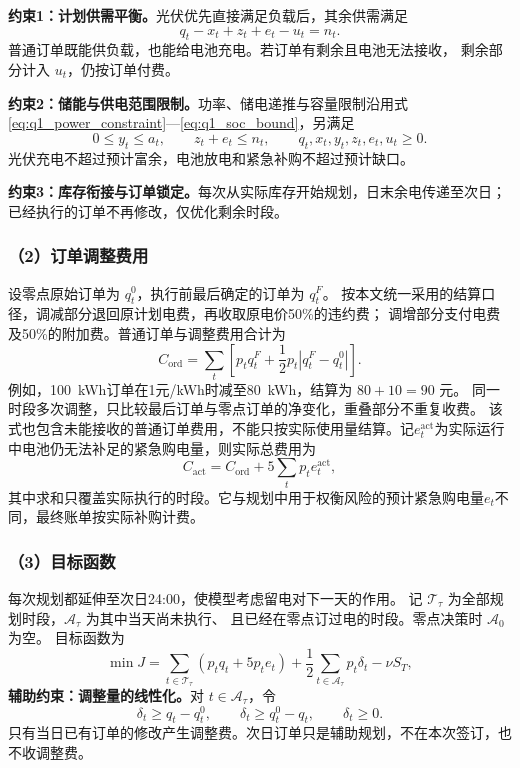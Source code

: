 \noindent\textbf{约束1：计划供需平衡。}光伏优先直接满足负载后，其余供需满足
\begin{equation}
q_t-x_t+z_t+e_t-u_t=n_t.
\end{equation}
普通订单既能供负载，也能给电池充电。若订单有剩余且电池无法接收，
剩余部分计入 $u_t$，仍按订单付费。

\noindent\textbf{约束2：储能与供电范围限制。}功率、储电递推与容量限制沿用式\eqref{eq:q1_power_constraint}—\eqref{eq:q1_soc_bound}，另满足
\begin{equation}
0\le y_t\le a_t,\qquad z_t+e_t\le n_t,\qquad q_t,x_t,y_t,z_t,e_t,u_t\ge0.
\end{equation}
光伏充电不超过预计富余，电池放电和紧急补购不超过预计缺口。

\noindent\textbf{约束3：库存衔接与订单锁定。}每次从实际库存开始规划，日末余电传递至次日；已经执行的订单不再修改，仅优化剩余时段。

\subsubsection*{（2）订单调整费用}

设零点原始订单为 $q_t^0$，执行前最后确定的订单为 $q_t^F$。
按本文统一采用的结算口径，调减部分退回原计划电费，再收取原电价50\%的违约费；
调增部分支付电费及50\%的附加费。普通订单与调整费用合计为
\begin{equation}
C_{\mathrm{ord}}=\sum_t\left[p_tq_t^F+\frac12p_t|q_t^F-q_t^0|\right].
\end{equation}
例如，100~kWh订单在1元/kWh时减至80~kWh，结算为 $80+10=90$ 元。
同一时段多次调整，只比较最后订单与零点订单的净变化，重叠部分不重复收费。
该式也包含未能接收的普通订单费用，不能只按实际使用量结算。记$e_t^{\mathrm{act}}$为实际运行中电池仍无法补足的紧急购电量，则实际总费用为
\[
C_{\mathrm{act}}=C_{\mathrm{ord}}+5\sum_t p_t e_t^{\mathrm{act}},
\]
其中求和只覆盖实际执行的时段。它与规划中用于权衡风险的预计紧急购电量$e_t$不同，最终账单按实际补购计费。

\subsubsection*{（3）目标函数}

每次规划都延伸至次日24:00，使模型考虑留电对下一天的作用。
记 $\mathcal T_{\tau}$ 为全部规划时段，$\mathcal A_{\tau}$ 为其中当天尚未执行、
且已经在零点订过电的时段。零点决策时 $\mathcal A_0$ 为空。
目标函数为
\begin{equation}
\min J=\sum_{t\in\mathcal T_{\tau}}(p_tq_t+5p_te_t)
+\frac12\sum_{t\in\mathcal A_{\tau}}p_t\delta_t-\nu S_T,
\end{equation}
\noindent\textbf{辅助约束：调整量的线性化。}对 $t\in\mathcal A_{\tau}$，令
\begin{equation}
\delta_t\geq q_t-q_t^0,\qquad
\delta_t\geq q_t^0-q_t,\qquad\delta_t\geq0.
\end{equation}
只有当日已有订单的修改产生调整费。次日订单只是辅助规划，不在本次签订，也不收调整费。

